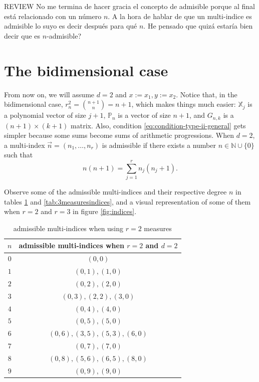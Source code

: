 \documentclass[12pt,a4]{article}
\theoremstyle{plain}
\newcommand{\N}[0]{\mathbb{N}}
\newcommand{\cb}[1]{{\color{blue}#1}}
\begin{document}
\cb{REVIEW No me termina de hacer gracia el concepto de admisible porque al final está relacionado con un número $n$. A la hora de hablar de que un multi-indice es admisible lo suyo es decir después para qué $n$. He pensado que quizá estaría bien decir que es $n$-admisible?}

\section{The bidimensional case}

From now on, we will assume $d=2$ and $x:=x_1, y:=x_2$. Notice that, in the bidimensional case, $r^2_n = \binom{n+1}{n} = n+1$, which makes things much easier: $\mathbb X_j$ is a polynomial vector of size $j+1$, $\mathbb P_n$ is a vector of size $n+1$, and $G_{n,k}$ is a $(n+1)\times(k+1)$ matrix. Also, condition \eqref{eq:condition-type-ii-general} gets simpler because some sums become sums of arithmetic progressions. When $d=2$, a multi-index $\vec n =(n_1,\dots,n_r)$ is admissible if there exists a number $n\in\N\cup \{0\}$ such that
\begin{equation}
    \label{eq:condition-type-ii}
    n(n+1)=\sum_{j=1}^r n_j (n_j+1).
\end{equation} 

Observe some of the admissible multi-indices and their respective degree $n$ in tables \ref{tab:2measuresindices} and \ref{tab:3measuresindices}, and a visual representation of some of them when $r=2$ and $r=3$ in figure \ref{fig:indices}.

\begin{table}[h]
    \centering
    \begin{tabular}{|c|c|}
    \hline
    $n$ & admissible multi-indices when $r=2$ and $d=2$ \\ \hline
    $0$ & $(0,0)$                                  \\ \hline
    $1$ & $(0,1), (1,0)$                           \\ \hline
    $2$ & $(0, 2), (2, 0)$                         \\ \hline
    $3$ & $(0, 3), (2, 2), (3, 0)$                 \\ \hline
    $4$ & $(0, 4), (4, 0)$                         \\ \hline
    $5$ & $(0, 5), (5, 0)$                         \\ \hline
    $6$ & $(0, 6), (3, 5), (5, 3), (6, 0)$         \\ \hline
    $7$ & $(0, 7), (7, 0)$                         \\ \hline
    $8$ & $(0, 8), (5, 6), (6, 5), (8, 0)$         \\ \hline
    $9$ & $(0, 9), (9, 0)$                         \\ \hline
    \end{tabular}
    \caption{admissible multi-indices when using $r=2$ measures}
    \label{tab:2measuresindices}
\end{table}
\end{document}
